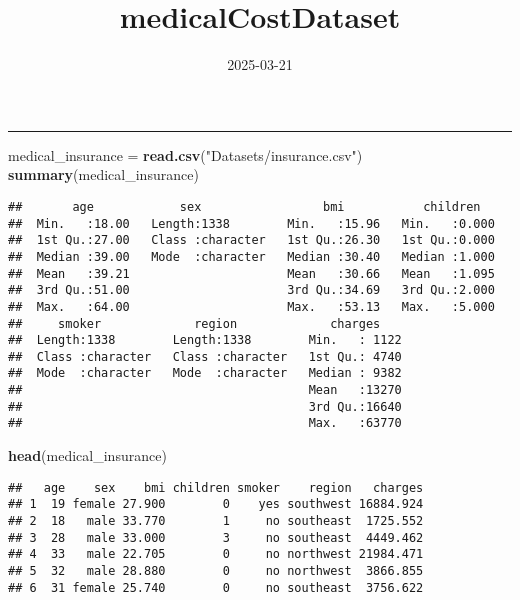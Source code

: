 \documentclass[
]{article}
\title{medicalCostDataset}
\author{}
\date{\vspace{-2.5em}2025-03-21}
\newenvironment{Shaded}{\begin{snugshade}}{\end{snugshade}}
\newcommand{\FunctionTok}[1]{\textcolor[rgb]{0.13,0.29,0.53}{\textbf{#1}}}
\newcommand{\NormalTok}[1]{#1}
\newcommand{\OtherTok}[1]{\textcolor[rgb]{0.56,0.35,0.01}{#1}}
\newcommand{\StringTok}[1]{\textcolor[rgb]{0.31,0.60,0.02}{#1}}
\begin{document}
\maketitle

\begin{center}\rule{0.5\linewidth}{0.5pt}\end{center}

\begin{Shaded}
\begin{Highlighting}[]
\NormalTok{medical\_insurance }\OtherTok{=} \FunctionTok{read.csv}\NormalTok{(}\StringTok{"Datasets/insurance.csv"}\NormalTok{)}
\FunctionTok{summary}\NormalTok{(medical\_insurance)}
\end{Highlighting}
\end{Shaded}

\begin{verbatim}
##       age            sex                 bmi           children    
##  Min.   :18.00   Length:1338        Min.   :15.96   Min.   :0.000  
##  1st Qu.:27.00   Class :character   1st Qu.:26.30   1st Qu.:0.000  
##  Median :39.00   Mode  :character   Median :30.40   Median :1.000  
##  Mean   :39.21                      Mean   :30.66   Mean   :1.095  
##  3rd Qu.:51.00                      3rd Qu.:34.69   3rd Qu.:2.000  
##  Max.   :64.00                      Max.   :53.13   Max.   :5.000  
##     smoker             region             charges     
##  Length:1338        Length:1338        Min.   : 1122  
##  Class :character   Class :character   1st Qu.: 4740  
##  Mode  :character   Mode  :character   Median : 9382  
##                                        Mean   :13270  
##                                        3rd Qu.:16640  
##                                        Max.   :63770
\end{verbatim}

\begin{Shaded}
\begin{Highlighting}[]
\FunctionTok{head}\NormalTok{(medical\_insurance)}
\end{Highlighting}
\end{Shaded}

\begin{verbatim}
##   age    sex    bmi children smoker    region   charges
## 1  19 female 27.900        0    yes southwest 16884.924
## 2  18   male 33.770        1     no southeast  1725.552
## 3  28   male 33.000        3     no southeast  4449.462
## 4  33   male 22.705        0     no northwest 21984.471
## 5  32   male 28.880        0     no northwest  3866.855
## 6  31 female 25.740        0     no southeast  3756.622
\end{verbatim}
\end{document}
